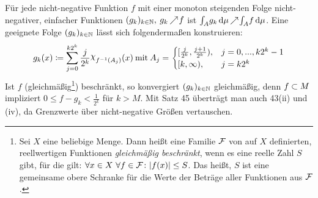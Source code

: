 \documentclass[skript.tex]{subfiles}
\begin{document}
	\begin{bem}
		Für jede nicht-negative Funktion $f$ mit einer monoton steigenden Folge nicht-negativer, einfacher Funktionen $(g_k)_{k\in\mathbb{N}}, \: g_k \kern -1pt \nearrow \kern -2pt f$ ist $ \int_A \! g_k \, \mathrm{d}\mu \kern -1pt \nearrow \kern -2pt \int_A \! f \, \mathrm{d}\mu$. Eine geeignete Folge $(g_k)_{k\in\mathbb{N}}$ lässt sich folgendermaßen konstruieren:
		\begin{equation*}
			g_k(x)\ceq \sum_{j=0}^{k2^k}\frac{j}{2^k}\rchi_{f^{-1}(A_j)}(x) \: \mathrm{mit} \:
			A_j=
			\begin{cases}
			[\frac{j}{2^k},\frac{j+1}{2^k}),& j=0,...,k2^k-1  \\
			[k,\infty),& j=k2^k
			\end{cases}
		\end{equation*}
		Ist $f$ (gleichmäßig\footnote{Sei $X$ eine beliebige Menge. Dann heißt eine Familie $\mathcal{F}$ von auf $X$ definierten, reellwertigen Funktionen \textit{gleichmäßig beschränkt}, wenn es eine reelle Zahl $S$ gibt, für die gilt: $\forall x \in X\ \forall f \in \mathcal{F}\colon |f(x)| \le S$. Das heißt, $S$ ist eine gemeinsame obere Schranke für die Werte der Beträge aller Funktionen aus $\mathcal{F}$.}) beschränkt, so konvergiert $(g_k)_{k\in\mathbb{N}}$ gleichmäßig, denn $f\subset M$ impliziert $0\leq f-g_k<\frac{1}{2^k}$ für $k>M$.
			Mit \textup{Satz 45} überträgt man auch \textup{43(ii)} und \textup{(iv)}, da Grenzwerte über nicht-negative Größen vertauschen.
	\end{bem}
\end{document}
